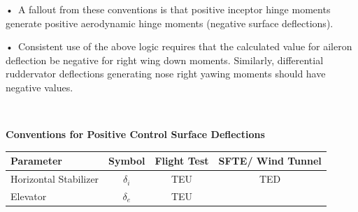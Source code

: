 \documentclass[
]{book}
\begin{document}
•~A fallout from these conventions is that positive inceptor hinge moments generate positive aerodynamic hinge moments (negative surface deflections).

•~Consistent use of the above logic requires that the calculated value for aileron deflection be negative for right wing down moments. Similarly, differential ruddervator deflections generating nose right yawing moments should have negative values.

\textbf{~}

\textbf{Conventions for Positive Control Surface Deflections}

\begin{longtable}[]{@{}lccc@{}}
\toprule
\begin{minipage}[b]{0.19\columnwidth}\raggedright
\textbf{Parameter}\strut
\end{minipage} & \begin{minipage}[b]{0.14\columnwidth}\centering
\textbf{Symbol}\strut
\end{minipage} & \begin{minipage}[b]{0.29\columnwidth}\centering
\textbf{Flight Test}\strut
\end{minipage} & \begin{minipage}[b]{0.27\columnwidth}\centering
\textbf{SFTE/}
\textbf{Wind Tunnel}\strut
\end{minipage}\tabularnewline
\midrule
\endhead
\begin{minipage}[t]{0.19\columnwidth}\raggedright
Horizontal Stabilizer\strut
\end{minipage} & \begin{minipage}[t]{0.14\columnwidth}\centering
\(\delta_i\)\strut
\end{minipage} & \begin{minipage}[t]{0.29\columnwidth}\centering
TEU\strut
\end{minipage} & \begin{minipage}[t]{0.27\columnwidth}\centering
TED\strut
\end{minipage}\tabularnewline
\begin{minipage}[t]{0.19\columnwidth}\raggedright
Elevator\strut
\end{minipage} & \begin{minipage}[t]{0.14\columnwidth}\centering
\(\delta_e\)\strut
\end{minipage} & \begin{minipage}[t]{0.29\columnwidth}\centering
TEU\strut
\end{minipage} & \begin{minipage}[t]{0.27\columnwidth}\centering

\end{minipage}
\end{longtable}
\end{document}
